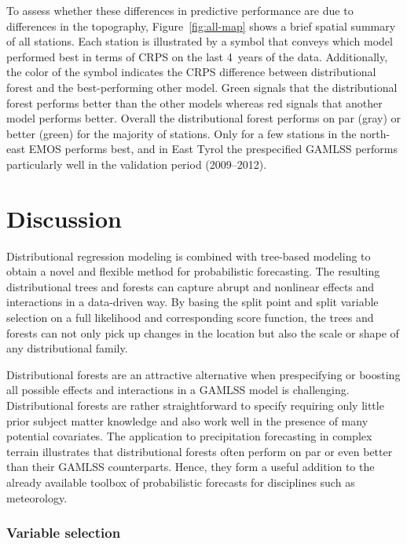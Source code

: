 \documentclass[aoas, preprint]{imsart}
\numberwithin{equation}{subsection}
\begin{document}
To assess whether these differences in predictive performance are due to differences
in the topography, Figure~\ref{fig:all-map} shows a brief spatial summary of all
stations. Each station is illustrated by a symbol that conveys which
model performed best in terms of CRPS on the last 4~years of the data.
Additionally, the color of the symbol indicates the CRPS difference between 
distributional forest and the best-performing other model. Green signals that
the distributional forest performs better than the other models whereas red
signals that another model performs better. Overall the distributional forest
performs on par (gray) or better (green) for the majority of stations. Only
for a few stations in the north-east EMOS performs best, and in East Tyrol
the prespecified GAMLSS performs particularly well in the validation period
(2009--2012).


\section{Discussion}
\label{sec:discussion}

Distributional regression modeling is combined with tree-based modeling
to obtain a novel and flexible method for probabilistic forecasting.
The resulting distributional trees and forests can capture abrupt and
nonlinear effects and interactions in a data-driven way. By basing the
split point and split variable selection on a full likelihood and
corresponding score function, the trees and forests can not only pick
up changes in the location but also the scale or shape of any distributional
family.

Distributional forests are an attractive alternative when prespecifying or
boosting all possible effects and interactions in a GAMLSS model is
challenging.  Distributional forests are rather straightforward to specify
requiring only little prior subject matter knowledge and also work well in the
presence of many potential covariates. The application to precipitation
forecasting in complex terrain illustrates that distributional forests often
perform on par or even better than their GAMLSS counterparts. Hence, they form
a useful addition to the already available toolbox of probabilistic forecasts
for disciplines such as meteorology.

\subsubsection*{Variable selection}
\end{document}
